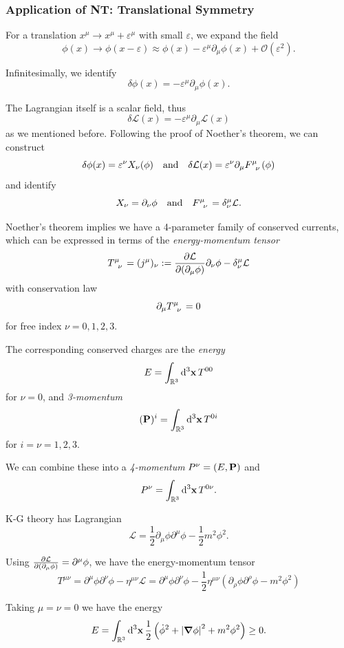 \documentclass[a4paper,11pt]{article}
\begin{document}
	\subsubsection{Application of NT: Translational Symmetry} 

	For a translation $x^\mu \to x^\mu + \varepsilon^\mu$ with small $\varepsilon$, we expand the field 
	\[
		\phi(x) \to \phi(x - \varepsilon) \approx \phi(x) - \varepsilon^\mu \partial_\mu \phi(x) + \mathcal{O}(\varepsilon^2).
	\]
	
	Infinitesimally, we identify 
	\[
		\delta \phi(x) = - \varepsilon^\mu \partial_\mu \phi(x).
	\]
	
	The Lagrangian itself is a scalar field, thus 
	\[
		\delta \mathcal{L}(x) = - \varepsilon^\mu \partial_\mu \mathcal{L}(x)
	\]
	as we mentioned before. Following the proof of Noether's theorem, we can construct 
	\[
		\delta \phi(x) = \varepsilon^\nu X_\nu (\phi) \quad \text{and} \quad \delta \mathcal{L} (x) = \varepsilon^\nu \partial_\mu F\indices{^\mu_\nu}(\phi)
	\]
	and identify
	\[
		X_\nu = \partial_\nu \phi \quad \text{and} \quad F\indices{^\mu_\nu} = \delta^\mu_\nu \mathcal{L}.
	\]
	
	Noether's theorem implies we have a 4-parameter family of conserved currents, which can be expressed in terms of the \emph{energy-momentum tensor}
	\begin{equation}
		T\indices{^\mu_\nu} = (j^\mu)_\nu := \pdv{\mathcal{L}}{(\partial_\mu \phi)} \partial_\nu \phi - \delta^\mu_\nu \mathcal{L}
		\label{eq:1.7.6}
	\end{equation}
	with conservation law
	\[
		\partial_\mu T\indices{^\mu_\nu} = 0
	\]
	for free index $\nu = 0,1,2,3$.

	The corresponding conserved charges are the \emph{energy}
	\[
		E = \int _{\mathbb{R}^3} \dd[3]{\vb x} T ^{00}
	\]
	for $\nu = 0$, and \emph{3-momentum}
	\[
		(\vb P)^i = \int _{\mathbb{R}^3} \dd[3]{\vb x} T ^{0i}
	\]
	for $i = \nu = 1,2,3$.

	We can combine these into a \emph{4-momentum} $P^\nu = (E, \vb P)$ and
	\[
		P^\nu = \int _{\mathbb{R}^3} \dd[3]{\vb x} T ^{0 \nu}.
	\]
	
	\begin{ex}
		K-G theory has Lagrangian
		\[
			\mathcal{L} = \frac{1}{2} \partial_\mu \phi \partial^\mu \phi - \frac{1}{2} m^2 \phi^2.
		\]
		
		Using $\pdv{\mathcal{L}}{(\partial_\mu \phi)} = \partial^\mu \phi$, we have the energy-momentum tensor
		\[
			T ^{\mu \nu} = \partial^\mu \phi \partial^\nu \phi - \eta ^{\mu \nu} \mathcal{L} = \partial^\mu \phi \partial^\nu \phi - \frac{1}{2}\eta ^{\mu \nu} \left( \partial_\rho \phi \partial^\rho \phi -  m^2 \phi^2 \right)
		\]
		
		Taking $\mu = \nu = 0$ we have the energy
		\[
			E = \int _{\mathbb{R}^3} \dd[3]{\vb x} \frac{1}{2} \left(\dot{\phi}^2 + \abs{\grad \phi}^2 +  m^2 \phi^2 \right)  \geq 0.
		\]
	\end{ex}
\end{document}
